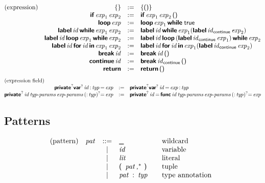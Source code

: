 $$
\begin{array}{@{}lrcl@{}}
\text{(expression)} &
\K\{ \K\} &:=&
  \K\{ \K{()} \K\} \\&
\KK{if} \x{exp}_1 \x{exp}_2 &:=&
  \KK{if} \x{exp}_1 \x{exp}_2 \K{()} \\&
\KK{loop} \x{exp} &:=&
  \KK{loop} \x{exp}_1 \KK{while} \; \K{true} \\&
\KK{label} \x{id} \KK{while} \x{exp}_1 \x{exp}_2 &:=&
  \KK{label} \x{id} \KK{while} \x{exp}_1 (\KK{label} \x{id}_{\K{continue}} \x{exp}_2) \\&
\KK{label} \x{id} \KK{loop} \x{exp}_1 \KK{while} \x{exp}_2 &:=&
  \KK{label} \x{id} \KK{loop} \, (\KK{label} \x{id}_{\K{continue}} \x{exp}_1) \, \KK{while} \x{exp}_2 \\&
\KK{label} \x{id} \KK{for} \x{id} \KK{in} \x{exp}_1 \x{exp}_2 &:=&
  \KK{label} \x{id} \KK{for} \x{id} \KK{in} \x{exp}_1 (\KK{label} \x{id}_{\K{continue}} \x{exp}_2) \\&
\KK{break} \x{id} &:=&
  \KK{break} \x{id} \K{()} \\&
\KK{continue} \x{id} &:=&
  \KK{break} \x{id}_{\K{continue}} \K{()} \\&
\KK{return} &:=&
  \KK{return} \, \K{()} \\
\end{array}
$$
$$
\begin{array}{@{}rcl@{}}
\text{(expression field)} \hfill \\
\KK{private}^? \KK{var}^? \x{id} \K: \x{typ} \K= \x{exp} &:=&
  \KK{private}^? \KK{var}^? \x{id} \K= \x{exp} \K: \x{typ} \\
\KK{private}^? \x{id} \x{typ-params} \x{exp-params} \, (\K: \x{typ})^? \K= \x{exp} &:=&
  \KK{private}^? \x{id} \K= \, \KK{func} \x{id} \x{typ-params} \x{exp-params} \, (\K: \x{typ})^? \K= \x{exp} \\
\end{array}
$$


\subsection*{Patterns}

$$
\begin{array}{@{}lrcl@{\qquad}l}
\text{(pattern)} & \x{pat} &::=&
  \K\textunderscore
    & \text{wildcard} \\&&|&
  \x{id}
    & \text{variable} \\&&|&
  \x{lit}
    & \text{literal} \\&&|&
  \K(~\x{pat}\K,^\ast~\K)
    & \text{tuple} \\&&|&
  \x{pat}~\K:~\x{typ}
    & \text{type annotation} \\
\end{array}
$$


